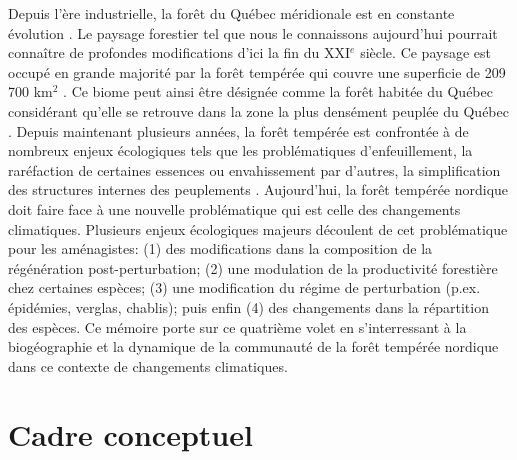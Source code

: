 
Depuis l'ère industrielle, la forêt du Québec méridionale est en constante évolution
\citep{Dupuis2011,Boucher2006}. Le paysage forestier tel que nous le connaissons aujourd'hui
pourrait connaître de profondes modifications d'ici la fin du XXI$^e$ siècle. Ce paysage est occupé
en grande majorité par la forêt tempérée qui couvre une superficie de 209 700 km$^2$
\citep{Boulay2015}. Ce biome peut ainsi être désignée comme la forêt habitée du
Québec considérant qu'elle se retrouve dans la zone la plus densément peuplée du Québec
\citep{Doyon2009}. Depuis maintenant plusieurs années, la forêt tempérée est confrontée à de
nombreux enjeux écologiques tels que les problématiques d'enfeuillement, la raréfaction de certaines
essences ou envahissement par d’autres, la simplification des structures internes des peuplements
\citep{Varady-Szabo2008}. Aujourd'hui, la forêt tempérée nordique doit faire face à une nouvelle
problématique qui est celle des changements climatiques. Plusieurs enjeux écologiques majeurs
découlent de cet problématique pour les aménagistes: (1) des modifications dans la composition de la
régénération post-perturbation; (2) une modulation de la productivité forestière chez certaines
espèces; (3) une modification du régime de perturbation (p.ex. épidémies, verglas, chablis); puis
enfin (4) des changements dans la répartition des espèces. Ce mémoire porte sur ce quatrième volet
en s'interressant à la biogéographie et la dynamique de la communauté de la forêt tempérée nordique
dans ce contexte de changements climatiques.

\section*{Cadre conceptuel}

